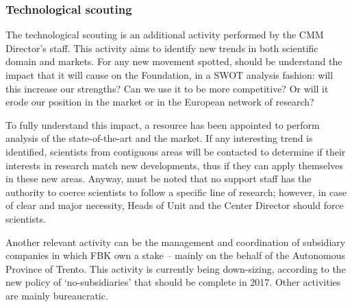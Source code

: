 \subsubsection{Technological scouting}

The technological scouting is an additional activity performed by the CMM Director’s staff. This activity aims to identify new trends in both scientific domain and markets. For any new movement spotted, should be understand the impact that it will cause on the Foundation, in a SWOT analysis fashion: will this increase our strengths? Can we use it to be more competitive? Or will it erode our position in the market or in the European network of research? 

To fully understand this impact, a resource has been appointed to perform analysis of the state-of-the-art and the market. If any interesting trend is identified, scientists from contiguous areas will be contacted to determine if their interests in research match new developments, thus if they can apply themselves in these new areas. Anyway, must be noted that no support staff has the authority to coerce scientists to follow a specific line of research; however, in case of clear and major necessity, Heads of Unit and the Center Director should force scientists. 

Another relevant activity can be the management and coordination of subsidiary companies in which FBK own a stake – mainly on the behalf of the Autonomous Province of Trento. This activity is currently being down-sizing, according to the new policy of ‘no-subsidiaries’ that should be complete in 2017.
Other activities are mainly bureaucratic. 
